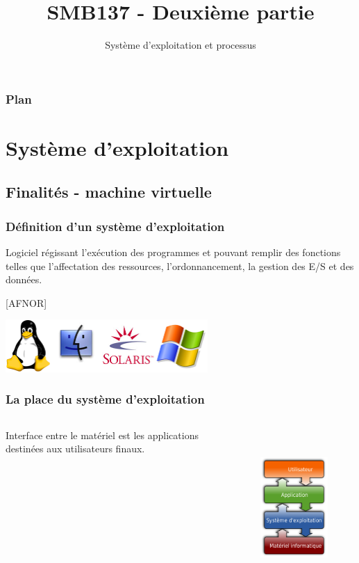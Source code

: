 

\title{SMB137 - Deuxième partie}
\subtitle{Système d'exploitation et processus}



\frame[plain]{\titlepage}

\begin{frame}
 \frametitle{Plan} 
 \tableofcontents
\end{frame} 


\section{Système d’exploitation}

\subsection{Finalités - machine virtuelle}
\begin{frame}
\frametitle{Définition d'un système d'exploitation}
\begin{definition}
Logiciel régissant l’exécution des programmes et pouvant remplir des
fonctions telles que l’affectation des ressources, l’ordonnancement,
la gestion des E/S et des données.

[AFNOR]
\end{definition}
\begin{center}
\includegraphics[height=2cm]{../illustration/Exemples_OS.png}
\end{center}
\end{frame}


\begin{frame}
\frametitle{La place du système d'exploitation}
\begin{columns}
Interface entre le matériel est les applications destinées aux utilisateurs finaux. \cite{wp-os}
\begin{figure}
\includegraphics[height=6cm]{../illustration/OS_placement.png}
\end{figure}
\end{columns}
\end{frame}




